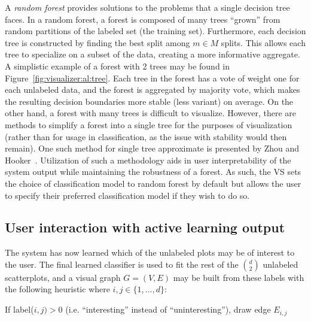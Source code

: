 A \textit{random forest} provides solutions to the problems that a single 
decision tree faces. In a random forest, a forest is composed of many trees 
``grown'' from random partitions of the labeled set (the training set). 
Furthermore, each decision tree is constructed by finding the best split among 
$m \in M$ splits. This allows each tree to specialize on a subset of the data, 
creating a more informative aggregate. A simplistic example of a forest with 2 
trees may be found in Figure~\ref{fig:visualizer:al:tree}.
Each tree in the forest has a vote of weight one for each unlabeled data, and 
the forest is aggregated by majority vote, which makes the resulting decision 
boundaries more stable (less variant) on average. On the other hand, a forest 
with many trees is difficult to visualize. However, there are methods to 
simplify a forest into a single tree for the purposes of visualization (rather 
than for usage in classification, as the issue with stability would then 
remain). One such method for single tree approximate is presented by Zhou and 
Hooker~\cite{zhou2016}. Utilization of such a methodology aids in user 
interpretability of the system output while maintaining the robustness of a 
forest. As such, the VS sets the choice of classification model to random 
forest by default but allows the user to specify their preferred classification 
model if they wish to do so.

\subsection{User interaction with active learning output}
\label{sec:visualizer:plotgeneration:user}

The system has now learned which of the unlabeled plots 
may be of interest to the user. The final learned classifier is used to fit the 
rest of the $d \choose 2$ unlabeled scatterplots, and a visual graph $G=(V,E)$ 
may be built from these labels with the following heuristic where $i,j \in 
\{1,...,d\}$:

\begin{algorithm}
	If label($i,j)>0$ (i.e. ``interesting'' instead of ``uninteresting''), draw 
	edge $E_{i,j}$
\end{algorithm}

